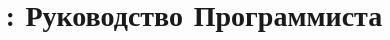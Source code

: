 \pagestyle{fancy}

\FrameIsDeeptrue

\makeindex

\newcommand{\BookName}{Руководство Программиста}

\ifonline %
  \title{\ProductName{}: \BookName{}}
\fi
